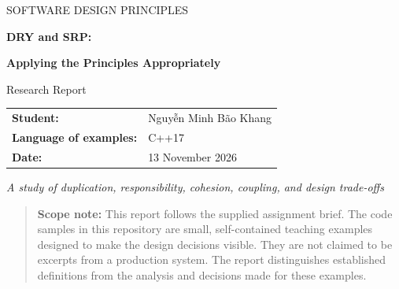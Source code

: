 \documentclass[12pt,a4paper]{article}
\begin{document}
\hypersetup{pageanchor=false}
\begin{titlepage}
\centering
\vspace*{2cm}
{\Large SOFTWARE DESIGN PRINCIPLES\par}
\vspace{1.3cm}
{\huge\bfseries DRY and SRP:\par}
\vspace{0.35cm}
{\LARGE\bfseries Applying the Principles Appropriately\par}
\vspace{1cm}
{\large Research Report\par}
\vfill
\begin{tabular}{@{}ll@{}}
    \textbf{Student:} & Nguyễn Minh Bão Khang\\[0.8cm]
    \textbf{Language of examples:} & C++17\\[0.8cm]
    \textbf{Date:} & 13 November 2026
  \end{tabular}
\vfill
{\large\itshape A study of duplication, responsibility, cohesion, coupling, and design trade-offs\par}
\end{titlepage}
\hypersetup{pageanchor=true}
\tableofcontents
\newpage
{}
\begin{quote}
\textbf{Scope note:} This report follows the supplied assignment brief. The code samples in this repository are small, self-contained teaching examples designed to make the design decisions visible. They are not claimed to be excerpts from a production system. The report distinguishes established definitions from the analysis and decisions made for these examples.
\end{quote}

\begin{abstract}

DRY (Don't Repeat Yourself) and SRP (Single Responsibility Principle) are widely used principles for organizing maintainable software. DRY is concerned with avoiding duplicated knowledge, while SRP is concerned with grouping behavior according to the reasons that cause it to change. Neither principle means that all similar-looking code must be shared or that every method must belong to a separate class. Applied without context, DRY can produce premature abstractions and unwanted dependencies; SRP can produce excessive classes, interfaces, wrappers, and indirection.

This report explains the purpose and practical application of both principles, examines situations in which their strict or superficial application can make a design worse, and evaluates five code-review scenarios. The examples use C++17 to compare duplicated and shared validation, independent business rules, an over-generalized percentage abstraction, a multi-purpose order service, a cohesive student record, and excessive getter/setter classes. The central conclusion is that design quality should be judged by the stability of the concepts being represented, the reasons components change, cohesion, coupling, and the cost of future maintenance—not by the number of duplicated lines or classes.

\end{abstract}
\end{document}
